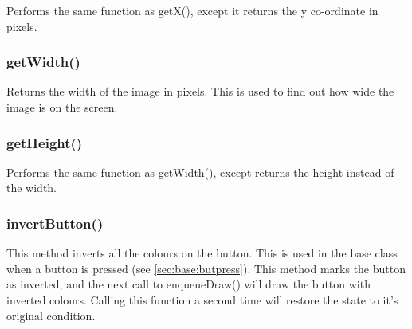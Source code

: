 Performs the same function as getX(), except it returns the y co-ordinate in pixels.

\subsubsection{getWidth()}

Returns the width of the image in pixels. This is used to find out how wide the image is on the screen.

\subsubsection{getHeight()}

Performs the same function as getWidth(), except returns the height instead of the width.

\subsubsection{invertButton()}

This method inverts all the colours on the button. This is used in the base class when a button is pressed (see \ref{sec:base:butpress}). This method marks the button as inverted, and the next call to enqueueDraw() will draw the button with inverted colours. Calling this function a second time will restore the state to it's original condition.